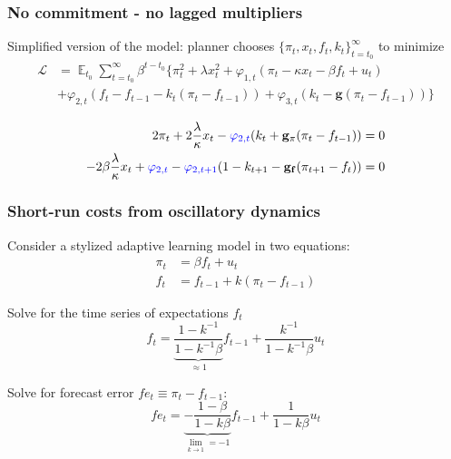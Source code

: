 \documentclass[11pt]{beamer}
\DeclareMathOperator{\E}{\mathbb{E}}
\begin{document}
\begin{frame}
	\frametitle{No commitment - no lagged multipliers}
	\label{no_commitment_intuition}
	
	Simplified version of the model: planner chooses $\{\pi_t, x_t, f_t, k_t\}_{t=t_0}^{\infty}$ to minimize
 \begin{align*}
\mathcal{L} &= \E_{t_0}\sum_{t=t_0}^{\infty} \beta^{t-t_0}\bigg\{ \pi_t^2  + \lambda x_t^2 + \varphi_{1,t} (\pi_t -\kappa x_t- \beta f_t +u_t) \\ &+ \varphi_{2,t}(f_t - f_{t-1} -k_t(\pi_t - f_{t-1})) + \varphi_{3,t}(k_t- \mathbf{g}(\pi_t - f_{t-1})) \bigg\}
 \end{align*}

 \begin{align}
  2\pi_t +2\frac{\lambda}{\kappa}x_t -\textcolor{blue}{\varphi_{2,t}}(k_t + \mathbf{g_{\pi}}(\pi_t -f_{t-1}))& = 0 \label{simpleFOC1} \\
  -2\beta\frac{\lambda}{\kappa}x_t + \textcolor{blue}{\varphi_{2,t}} -\textcolor{blue}{\varphi_{2,t+1}}(1-k_{t+1} -\mathbf{g_{f}}(\pi_{t+1} -f_{t})) & = 0 \label{simpleFOC2} 
 \end{align}

  
\hyperlink{no_commitment}{}	


\end{frame}

\begin{frame}
	\frametitle{Short-run costs from oscillatory dynamics}
	\label{SRcosts}

 Consider a stylized adaptive learning model in two equations:
\begin{align}
\pi_t & = \beta f_t + u_t \label{simple_NKPC} \\
f_t & = f_{t-1} + k(\pi_t - f_{t-1}) \label{simple_expectations}
\end{align}

Solve for the time series of expectations $f_t$
\begin{equation}
f_t = \underbrace{\frac{1-k^{-1}}{1-k^{-1}\beta}}_{\approx 1}f_{t-1} + \frac{k^{-1}}{1-k^{-1}\beta}u_t
\end{equation}

Solve for forecast error $fe_t \equiv \pi_t - f_{t-1}$:
\begin{equation}
fe_t = \underbrace{-\frac{1-\beta}{1-k\beta}}_{\lim_{k \to 1} = -1}f_{t-1} + \frac{1}{1-k\beta}u_t \label{oscillating_fe}
\end{equation}

 
\hyperlink{SRLRtradeoffs}{}	


\end{frame}
\end{document}

